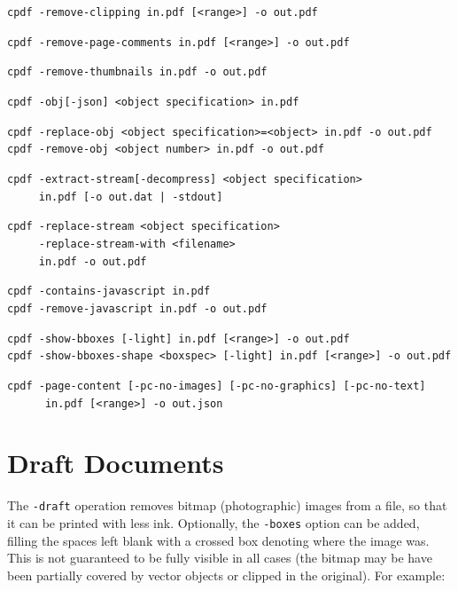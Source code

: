 \documentclass{book}
\begin{document}
{\begin{framed}
  \vspace{1.5mm}
  \noindent\verb!cpdf -remove-clipping in.pdf [<range>] -o out.pdf!

  \vspace{1.5mm}
  \noindent\verb!cpdf -remove-page-comments in.pdf [<range>] -o out.pdf!

  \vspace{1.5mm}
  \noindent\verb!cpdf -remove-thumbnails in.pdf -o out.pdf!

  \vspace{1.5mm}
  \noindent\verb!cpdf -obj[-json] <object specification> in.pdf!

  \vspace{1.5mm}
  \noindent\verb!cpdf -replace-obj <object specification>=<object> in.pdf -o out.pdf!\\
  \noindent\verb!cpdf -remove-obj <object number> in.pdf -o out.pdf!

  \vspace{1.5mm}
  \noindent\verb!cpdf -extract-stream[-decompress] <object specification>!\\
  \noindent\verb!     in.pdf [-o out.dat | -stdout]!

  \vspace{1.5mm}
  \noindent\verb!cpdf -replace-stream <object specification>!\\
  \noindent\verb!     -replace-stream-with <filename>!\\
  \noindent\verb!     in.pdf -o out.pdf!

  \vspace{1.5mm}
  \noindent\verb!cpdf -contains-javascript in.pdf!\\
  \noindent\verb!cpdf -remove-javascript in.pdf -o out.pdf!

  \vspace{1.5mm}
  \noindent\verb!cpdf -show-bboxes [-light] in.pdf [<range>] -o out.pdf!\\
  \noindent\verb!cpdf -show-bboxes-shape <boxspec> [-light] in.pdf [<range>] -o out.pdf!

  \vspace{1.5mm}
  \noindent\verb!cpdf -page-content [-pc-no-images] [-pc-no-graphics] [-pc-no-text]!\\
  \noindent\verb!      in.pdf [<range>] -o out.json!\end{framed}}

  \section{Draft Documents}
\label{draft}
    The \texttt{-draft} operation removes bitmap (photographic) images from a
file, so that it can be printed with less ink. Optionally, the
\texttt{-boxes} option can be added, filling the spaces left blank with a
crossed box denoting where the image was. This is not guaranteed to be fully
visible in all cases (the bitmap may be have been partially covered by vector
objects or clipped in the original). For example:
\end{document}
